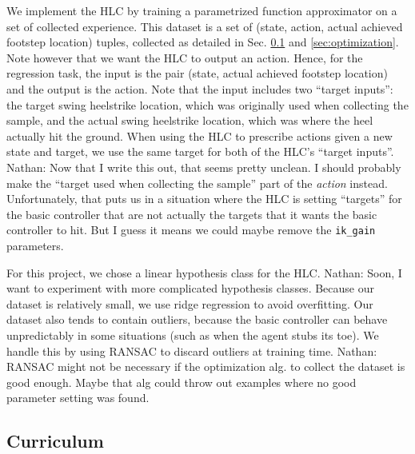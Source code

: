 \documentclass[a4paper]{article}
\newcommand{\nhatch}[1]{{\leavevmode\color{blue} Nathan: #1}}
\begin{document}
We implement the HLC by training a parametrized function approximator on a set of collected experience.
This dataset is a set of (state, action, actual achieved footstep location) tuples, collected as detailed in Sec. \ref{sec:curriculum} and \ref{sec:optimization}.
Note however that we want the HLC to output an action.
Hence, for the regression task, the input is the pair (state, actual achieved footstep location) and the output is the action.
Note that the input includes two ``target inputs'': the target swing heelstrike location, which was originally used when collecting the sample, and the actual swing heelstrike location, which was where the heel actually hit the ground.
When using the HLC to prescribe actions given a new state and target, we use the same target for both of the HLC's ``target inputs''.
\nhatch{Now that I write this out, that seems pretty unclean. I should probably make the ``target used when collecting the sample'' part of the \emph{action} instead. Unfortunately, that puts us in a situation where the HLC is setting ``targets'' for the basic controller that are not actually the targets that it wants the basic controller to hit. But I guess it means we could maybe remove the \texttt{ik\_gain} parameters.}

For this project, we chose a linear hypothesis class for the HLC.
\nhatch{Soon, I want to experiment with more complicated hypothesis classes.}
Because our dataset is relatively small, we use ridge regression to avoid overfitting.
Our dataset also tends to contain outliers, because the basic controller can behave unpredictably in some situations (such as when the agent stubs its toe).
We handle this by using RANSAC \citep{fischler1981random} to discard outliers at training time.
\nhatch{RANSAC might not be necessary if the optimization alg. to collect the dataset is good enough. Maybe that alg could throw out examples where no good parameter setting was found.}

\subsection{Curriculum} \label{sec:curriculum}
\end{document}
